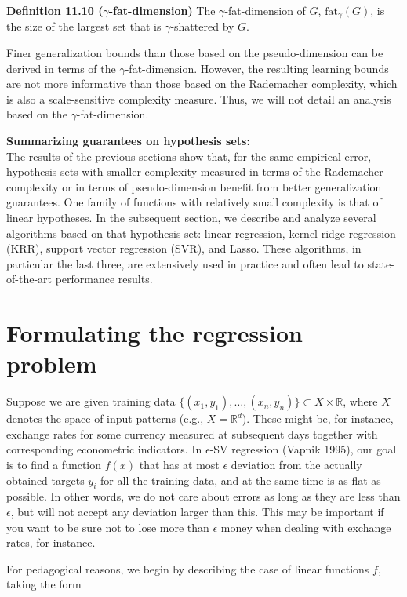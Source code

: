 \documentclass[fleqn,10pt]{olplainarticle}
\begin{document}
\textbf{Definition 11.10 ($\gamma$-fat-dimension)}
The \(\gamma\)-fat-dimension of \(G\), \(\text{fat}_{\gamma}(G)\), is the size of the largest set that is \(\gamma\)-shattered by \(G\).

Finer generalization bounds than those based on the pseudo-dimension can be derived in terms of the \(\gamma\)-fat-dimension. However, the resulting learning bounds are not more informative than those based on the Rademacher complexity, which is also a scale-sensitive complexity measure. Thus, we will not detail an analysis based on the \(\gamma\)-fat-dimension.


\textbf{Summarizing guarantees on hypothesis sets:}
\\The results of the previous sections show that, for the same empirical error, hypothesis sets with smaller complexity measured in terms of the Rademacher complexity or in terms of pseudo-dimension benefit from better generalization guarantees. One family of functions with relatively small complexity is that of linear hypotheses. In the subsequent section, we describe and analyze several algorithms based on that hypothesis set: linear regression, kernel ridge regression (KRR), support vector regression (SVR), and Lasso. These algorithms, in particular the last three, are extensively used in practice and often lead to state-of-the-art performance results.


\section{Formulating the regression problem}

Suppose we are given training data $\{(x_1, y_1), \ldots, (x_n, y_n)\} \subset X \times \mathbb{R}$, where $X$ denotes the space of input patterns (e.g., $X = \mathbb{R}^d$). These might be, for instance, exchange rates for some currency measured at subsequent days together with corresponding econometric indicators. In $\epsilon$-SV regression (Vapnik 1995), our goal is to find a function $f(x)$ that has at most $\epsilon$ deviation from the actually obtained targets $y_i$ for all the training data, and at the same time is as flat as possible. In other words, we do not care about errors as long as they are less than $\epsilon$, but will not accept any deviation larger than this. This may be important if you want to be sure not to lose more than $\epsilon$ money when dealing with exchange rates, for instance.

For pedagogical reasons, we begin by describing the case of linear functions $f$, taking the form
\end{document}
